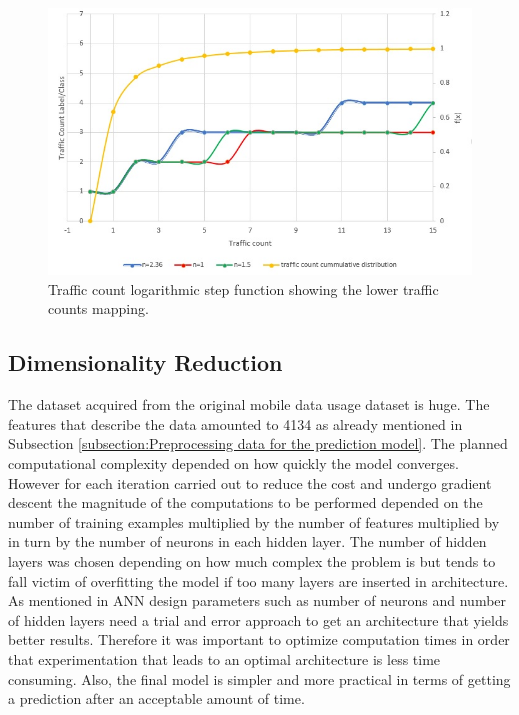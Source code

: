 \documentclass[12pt, a4paper]{report}
\theoremstyle{definition}
\theoremstyle{definition}%
\theoremstyle{definition}%
\theoremstyle{definition}%
\theoremstyle{definition}%
\theoremstyle{definition}%
\begin{document}
\begin{figure}[!]	
	\includegraphics[scale=0.70]{steps_function_zoom_in.jpg}
	\centering
	\caption{Traffic count logarithmic step function showing the lower traffic counts mapping. }
	\label{fig:label_classification_of_traffic_count_zoom_in}
\end{figure}


\subsection{Dimensionality Reduction}
The dataset acquired from the original mobile data usage dataset is huge. The features that describe the data amounted to 4134 as already mentioned in Subsection \ref{subsection:Preprocessing data for the prediction model}. The planned computational complexity depended on how quickly the model converges. However for each iteration carried out to reduce the cost and undergo gradient descent the magnitude of the computations to be performed depended on the number of training examples multiplied by the number of features multiplied by in turn by the number of neurons in each hidden layer. The number of hidden layers was chosen depending on how much complex the problem is but tends to fall victim of overfitting the model if too many layers are inserted in architecture. As mentioned in \cite{Jain1996} ANN design parameters such as number of neurons and number of hidden layers need a trial and error approach to get an architecture that yields better results. Therefore it was important to optimize computation times in order that experimentation that leads to an optimal architecture is less time consuming. Also, the final model is simpler and more practical in terms of getting a prediction after an acceptable amount of time.
\end{document}
